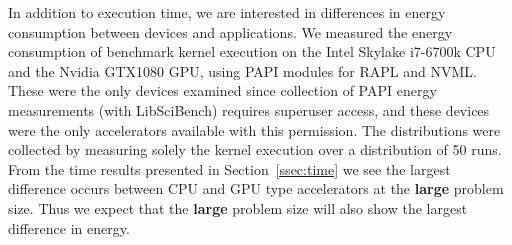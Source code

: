 \documentclass[../document.tex]{subfiles}
\begin{document}
\label{ssec:energy}
	
In addition to execution time, we are interested in differences in energy consumption between devices and applications.
We measured the energy consumption of benchmark kernel execution on the Intel Skylake i7-6700k CPU and the Nvidia GTX1080 GPU, using PAPI modules for RAPL and NVML. 
These were the only devices examined since collection of PAPI energy measurements (with LibSciBench) requires superuser access, and these devices were the only accelerators available with this permission.
The distributions were collected by measuring solely the kernel execution over a distribution of 50 runs.
From the time results presented in Section~\ref{ssec:time} we see the largest difference occurs between CPU and GPU type accelerators at the {\bf large} problem size.
Thus we expect that the {\bf large} problem size will also show the largest difference in energy.
\end{document}
